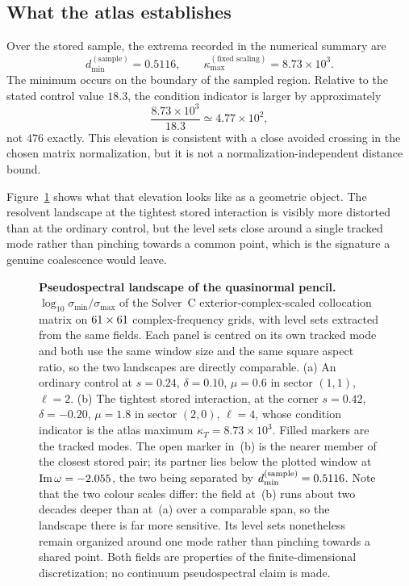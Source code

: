 \documentclass[10pt]{article}
\theoremstyle{plain}
\newcommand{\Imy}{\operatorname{Im}}
\newcommand{\dmin}{d^{(\mathrm{sample})}_{\min}}
\begin{document}
\begin{table}[t]
\centering
\caption{Finite-atlas census and continuation bookkeeping. Counts refer to
stored computations; they do not constitute a covering certificate for the
continuous parameter domain.}
\label{tab:census}

\end{table}

\subsection{What the atlas establishes}

Over the stored sample, the extrema recorded in the numerical summary are
\begin{equation}
\dmin=0.5116,\qquad \kappa^{(\text{fixed scaling})}_{\max}=8.73\times10^3 .
\end{equation}
The minimum occurs on the boundary of the sampled region. Relative to the
stated control value $18.3$, the condition indicator is larger by approximately
\begin{equation}
\frac{8.73\times10^3}{18.3}\simeq4.77\times10^2 ,
\end{equation}
not $476$ exactly. This elevation is consistent with a close avoided crossing in
the chosen matrix normalization, but it is not a normalization-independent
distance bound.

Figure~\ref{fig:pseudo} shows what that elevation looks like as a geometric
object. The resolvent landscape at the tightest stored interaction is visibly
more distorted than at the ordinary control, but the level sets close around a
single tracked mode rather than pinching towards a common point, which is the
signature a genuine coalescence would leave.

\begin{figure}[t]
\centering

\caption{\textbf{Pseudospectral landscape of the quasinormal pencil.}
$\log_{10}\sigma_{\min}/\sigma_{\max}$ of the Solver~C exterior-complex-scaled
collocation matrix on $61\times61$ complex-frequency grids, with
level sets extracted from the same fields. Each panel is centred on its own
tracked mode and both use the same window size and the same square aspect
ratio, so the two landscapes are directly comparable. (a) An ordinary control
at $s=0.24$, $\delta=0.10$, $\mu=0.6$ in sector $(1,1)$, $\ell=2$. (b) The
tightest stored interaction, at the corner $s=0.42$, $\delta=-0.20$, $\mu=1.8$
in sector $(2,0)$, $\ell=4$, whose condition indicator is the atlas maximum
$\kappa_T=8.73\times10^3$. Filled markers are the tracked modes. The open
marker in~(b) is the nearer member of the closest stored pair; its partner lies
below the plotted window at $\Imy\omega=\psPartnerIm$, the two being separated
by $\dmin=\psGap$. Note that the two colour scales differ: the field at~(b)
runs about two decades deeper than at~(a) over a comparable span, so the
landscape there is far more sensitive. Its level sets nonetheless remain
organized around one mode rather than pinching towards a shared point. Both
fields are properties of the finite-dimensional discretization; no continuum
pseudospectral claim is made.}
\label{fig:pseudo}
\end{figure}
\end{document}
